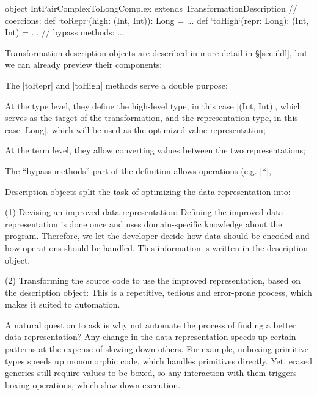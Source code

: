 \begin{lstlisting-nobreak}
object IntPairComplexToLongComplex
          extends TransformationDescription {
  // coercions:
  def `toRepr`(high: (Int, Int)): Long = ...
  def `toHigh`(repr: Long): (Int, Int) = ...
  // bypass methods:
  ...
}
\end{lstlisting-nobreak}

\noindent
Transformation description objects are described in more detail in \S\ref{sec:ildl}, but we can already preview their components:
\begin{compactitem}
  \item The |toRepr| and |toHigh| methods serve a double purpose:
  \begin{compactitem}
    \item At the type level, they define the high-level type, in this case |(Int, Int)|, which serves as the target of the transformation, and the representation type, in this case |Long|, which will be used as the optimized value representation;
    \item At the term level, they allow converting values between the two representations;
  \end{compactitem}
  \item The ``bypass methods'' part of the definition allows operations (e.g. |*|, |%
\end{compactitem}

Description objects split the task of optimizing the data representation into:
\begin{compactitem}
\item[(1)] Devising an improved data representation: Defining the improved data representation is done once and uses domain-specific knowledge about the program. Therefore, we let the developer decide how data should be encoded and how operations should be handled. This information is written in the description object.
\item[(2)] Transforming the source code to use the improved representation, based on the description object: This is a repetitive, tedious and error-prone process, which makes it suited to automation.
\end{compactitem}

A natural question to ask is why not automate the process of finding a better data representation? Any change in the data representation speeds up certain patterns at the expense of slowing down others. For example, unboxing primitive types speeds up monomorphic code, which handles primitives directly. Yet, erased generics still require values to be boxed, so any interaction with them triggers boxing operations, which slow down execution. %

